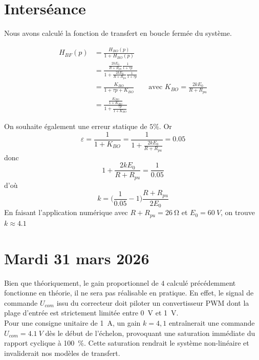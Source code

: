\documentclass[11pt]{report}
\begin{document}
\chapter*{Interséance}
Nous avons calculé la fonction de transfert en boucle fermée du système. 

\begin{align*}
  H_{BF}(p) &= \frac{H_{BO}(p)}{1+H_{BO}(p)}\\
            &= \frac{\frac{2kE_0}{R+R_{pu}} \frac{1}{1+\tau p}}{1+\frac{2kE_0}{R+R_{pu}} \frac{1}{1+\tau p}} \\
            &= \frac{K_{BO}}{1+\tau p + K_{BO}} \quad\quad \text{avec } K_{BO} = \frac{2kE_0}{R+R_{pu}}  \\
            &= \frac{\frac{K_{BO}}{1+K_{BO}}}{1 + \frac{\tau p }{1+K_{BO}}}
\end{align*}

On souhaite également une erreur statique de $5\%$. Or
\begin{equation*}
  \varepsilon = \frac{1}{1+K_{BO}} = \frac{1}{1+\frac{2kE_0}{R+R_{pu}}} = 0.05
\end{equation*}
donc \begin{equation*}
  1 + \frac{2kE_0}{R+R_{pu}} = \frac{1}{0.05}
\end{equation*}
d'où \begin{equation*}
  k = \Big(\frac{1}{0.05} -1\Big) \frac{R+R_{pu}}{2E_0}
\end{equation*}
En faisant l'application numérique avec $R+R_{pu} = \qty{26}{\ohm}$ et $E_0 = \qty{60}{V}$, on trouve $k\approx4.1$ 

\chapter{Mardi 31 mars 2026}
Bien que théoriquement, le gain proportionnel de $4$ calculé précédemment fonctionne en théorie, il ne sera pas réalisable en pratique. En effet, le signal de commande $U_{com}$ issu du correcteur doit piloter un convertisseur PWM dont la plage d'entrée est strictement limitée entre \qty{0}{V} et \qty{1}{V}. \\

Pour une consigne unitaire de \qty{1}{A}, un gain $k=4,1$ entraînerait une commande $U_{com} = \qty{4,1}{V}$ dès le début de l'échelon, provoquant une saturation immédiate du rapport cyclique à \qty{100}{\%}. Cette saturation rendrait le système non-linéaire et invaliderait nos modèles de transfert. \\
\end{document}

